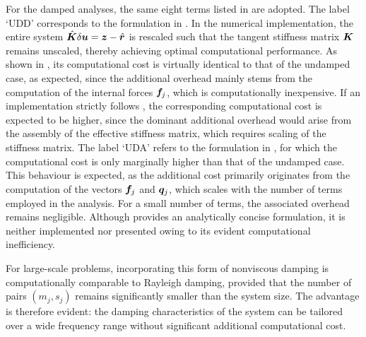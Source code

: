 For the damped analyses, the same eight terms listed in  are adopted.
The label `UDD' corresponds to the formulation in .
In the numerical implementation, the entire system $\hat{\bm{K}}\delta\bm{u}=\bm{z}-\hat{\bm{r}}$ is rescaled such that the tangent stiffness matrix $\bm{K}$ remains unscaled, thereby achieving optimal computational performance.
As shown in , its computational cost is virtually identical to that of the undamped case, as expected, since the additional overhead mainly stems from the computation of the internal forces $\bm{f}_j$, which is computationally inexpensive.
If an implementation strictly follows , the corresponding computational cost is expected to be higher, since the dominant additional overhead would arise from the assembly of the effective stiffness matrix, which requires scaling of the stiffness matrix.
The label `UDA' refers to the formulation in , for which the computational cost is only marginally higher than that of the undamped case.
This behaviour is expected, as the additional cost primarily originates from the computation of the vectors $\bm{f}_j$ and $\bm{q}_j$, which scales with the number of terms employed in the analysis.
For a small number of terms, the associated overhead remains negligible.
Although  provides an analytically concise formulation, it is neither implemented nor presented owing to its evident computational inefficiency.

For large-scale problems, incorporating this form of nonviscous damping is computationally comparable to Rayleigh damping, provided that the number of pairs $(m_j, s_j)$ remains significantly smaller than the system size.
The advantage is therefore evident: the damping characteristics of the system can be tailored over a wide frequency range without significant additional computational cost.